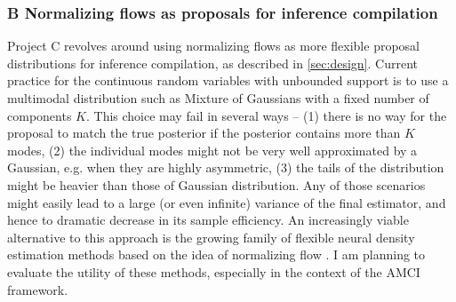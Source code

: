 \documentclass[12pt]{article}
\begin{document}
\subsubsection*{B \quad Normalizing flows as proposals for inference compilation}
Project C revolves around using normalizing flows as more flexible proposal distributions for inference compilation, as described in \autoref{sec:design}.
Current practice for the continuous random variables with unbounded support is to use a multimodal distribution such as Mixture of Gaussians with a fixed number of components $K$.
This choice may fail in several ways -- 
(1) there is no way for the proposal to match the true posterior if the posterior contains more than $K$ modes,
(2) the individual modes might not be very well approximated by a Gaussian, e.g. when they are highly asymmetric,
(3) the tails of the distribution might be heavier than those of Gaussian distribution.
Any of those scenarios might easily lead to a large (or even infinite) variance of the final estimator, 
and hence to dramatic decrease in its sample efficiency.
An increasingly viable alternative to this approach is the growing family of flexible neural density estimation methods based on the idea of normalizing flow \citep{RezendeMohamed2015}.
I am planning to evaluate the utility of these methods, especially in the context of the AMCI framework. 
\end{document}

